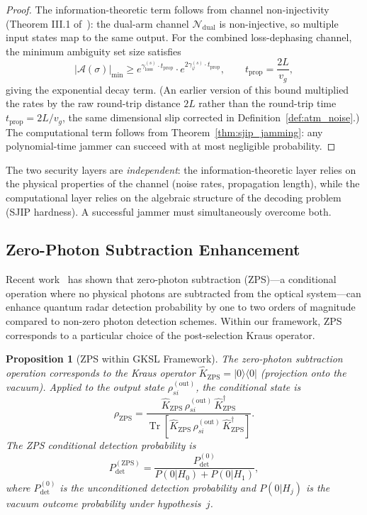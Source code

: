 \documentclass[journal]{IEEEtran}
\newtheorem{proposition}{Proposition}
\DeclareMathOperator{\Tr}{Tr}
\begin{document}
\begin{proof}
The information-theoretic term follows from channel non-injectivity (Theorem III.1 of~\cite{gautum2024rigorous}): the dual-arm channel $\mathcal{N}_{\text{dual}}$ is non-injective, so multiple input states map to the same output. For the combined loss-dephasing channel, the minimum ambiguity set size satisfies
\begin{equation}
|\mathcal{A}(\sigma)|_{\min} \geq e^{\gamma_{\text{loss}}^{(s)} \cdot t_{\text{prop}}} \cdot e^{2\gamma_\varphi^{(s)} \cdot t_{\text{prop}}},\qquad t_{\text{prop}}=\frac{2L}{v_g},
\end{equation}
giving the exponential decay term. (An earlier version of this bound multiplied the rates by the raw round-trip distance $2L$ rather than the round-trip time $t_{\text{prop}}=2L/v_g$, the same dimensional slip corrected in Definition~\ref{def:atm_noise}.) The computational term follows from Theorem~\ref{thm:sjip_jamming}: any polynomial-time jammer can succeed with at most negligible probability.
\end{proof}

The two security layers are \textit{independent}: the information-theoretic layer relies on the physical properties of the channel (noise rates, propagation length), while the computational layer relies on the algebraic structure of the decoding problem (SJIP hardness). A successful jammer must simultaneously overcome both.

\subsection{Zero-Photon Subtraction Enhancement}

Recent work~\cite{zhao2025quantum} has shown that zero-photon subtraction (ZPS)---a conditional operation where no physical photons are subtracted from the optical system---can enhance quantum radar detection probability by one to two orders of magnitude compared to non-zero photon detection schemes. Within our framework, ZPS corresponds to a particular choice of the post-selection Kraus operator.

\begin{proposition}[ZPS within GKSL Framework]\label{prop:zps}
The zero-photon subtraction operation corresponds to the Kraus operator $\hat{K}_{\text{ZPS}} = |0\rangle\langle 0|$ (projection onto the vacuum). Applied to the output state $\rho_{si}^{(\text{out})}$, the conditional state is
\begin{equation}\label{eq:zps_state}
\rho_{\text{ZPS}} = \frac{\hat{K}_{\text{ZPS}}\,\rho_{si}^{(\text{out})}\,\hat{K}_{\text{ZPS}}^\dagger}{\Tr[\hat{K}_{\text{ZPS}}\,\rho_{si}^{(\text{out})}\,\hat{K}_{\text{ZPS}}^\dagger]}.
\end{equation}
The ZPS conditional detection probability is
\begin{equation}\label{eq:zps_prob}
P_{\text{det}}^{(\text{ZPS})} = \frac{P_{\text{det}}^{(0)}}{P(0|H_0) + P(0|H_1)},
\end{equation}
where $P_{\text{det}}^{(0)}$ is the unconditioned detection probability and $P(0|H_j)$ is the vacuum outcome probability under hypothesis~$j$.
\end{proposition}
\end{document}

